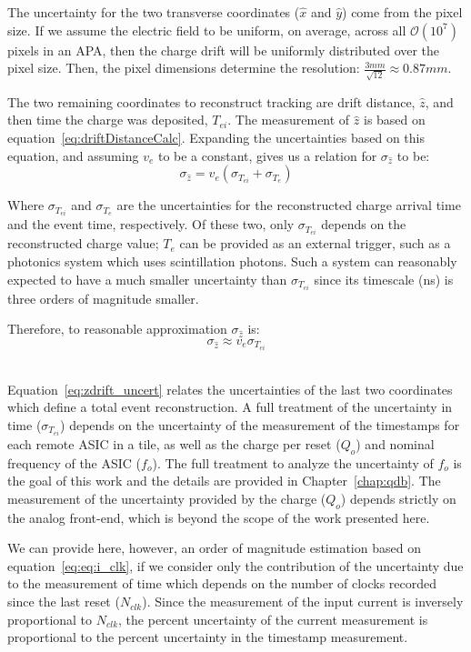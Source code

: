 The uncertainty for the two transverse coordinates ($\hat{x}$ and $\hat{y}$) come from the pixel size.
If we assume the electric field to be uniform, on average, across all $\mathcal{O}(10^{7})$ pixels in an APA, then the charge drift will be uniformly distributed over the pixel size.
Then, the pixel dimensions determine the resolution: $\frac{3 mm}{\sqrt{12}} \approx 0.87 mm$.

The two remaining coordinates to reconstruct tracking are drift distance, $\hat{z}$, and then time the charge was deposited, $T_{ei}$.
The measurement of $\hat{z}$ is based on equation~\ref{eq:driftDistanceCalc}.
Expanding the uncertainties based on this equation, and assuming $v_{e}$ to be a constant, gives us a relation for $\sigma_{\hat{z}}$ to be:
\begin{equation}
  \sigma_{\hat{z}} = v_{e}(\sigma_{T_{ei}} +  \sigma_{T_{e}})
\end{equation}

Where $\sigma_{T_{ei}}$ and $\sigma_{T_{e}}$ are the uncertainties for the reconstructed charge arrival time and the event time, respectively.
Of these two, only $\sigma_{T_{ei}}$ depends on the reconstructed charge value; $T_{e}$ can be provided as an external trigger, such as a photonics system which uses scintillation photons.
Such a system can reasonably expected to have a much smaller uncertainty than $\sigma_{T_{ei}}$ since its timescale (ns) is three orders of magnitude smaller.

Therefore, to reasonable approximation $\sigma_{\hat{z}}$ is:
\begin{equation}
  \sigma_{\hat{z}} \approx v_{e}\sigma_{T_{ei}}
\end{equation}~\label{eq:zdrift_uncert}

Equation~\ref{eq:zdrift_uncert} relates the uncertainties of the last two coordinates which define a total event reconstruction.
A full treatment of the uncertainty in time ($\sigma_{T_{ei}}$) depends on the uncertainty of the measurement of the timestamps for each remote ASIC in a tile, as well as the charge per reset ($Q_{o}$) and nominal frequency of the ASIC ($f_{o}$).
The full treatment to analyze the uncertainty of $f_{o}$ is the goal of this work and the details are provided in Chapter~\ref{chap:qdb}.
The measurement of the uncertainty provided by the charge ($Q_{o}$) depends strictly on the analog front-end, which is beyond the scope of the work presented here.

We can provide here, however, an order of magnitude estimation based on equation~\ref{eq:eq:i_clk}, if we consider only the contribution of the uncertainty due to the measurement of time which depends on the number of clocks recorded since the last reset ($N_{clk}$).
Since the measurement of the input current is inversely proportional to $N_{clk}$, the percent uncertainty of the current measurement is proportional to the percent uncertainty in the timestamp measurement.

